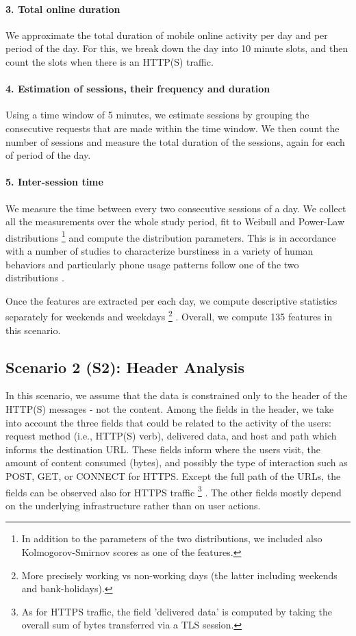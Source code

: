 \paragraph{3. Total online duration} We approximate the total duration of mobile online activity per day and per period of the day. For this, we break down the day into 10 minute slots, and then count the slots when there is an HTTP(S) traffic. 

\paragraph{4. Estimation of sessions, their frequency and duration} Using a time window of 5 minutes, we estimate sessions by grouping the consecutive requests that are made within the time window. We then count the number of sessions and measure the total duration of the sessions, again for each of period of the day. 

\paragraph{5. Inter-session time} We measure the time between every two consecutive sessions of a day. We collect all the measurements over the whole study period, fit to Weibull and Power-Law distributions
\footnote{In addition to the parameters of the two distributions, we included also Kolmogorov-Smirnov scores as one of the features.}
 and compute the distribution parameters. This is in accordance with a number of studies to characterize burstiness in a variety of human behaviors \cite{barabasi2005origin} and particularly phone usage patterns follow one of the two distributions \cite{jiang2013calling}.

Once the features are extracted per each day, we compute descriptive statistics separately for weekends and weekdays
\footnote{More precisely working vs non-working days (the latter including weekends and bank-holidays).}
. Overall, we compute 135 features in this scenario. 

\subsection{Scenario 2 (S2): Header Analysis}
In this scenario, we assume that the data is constrained only to the header of the HTTP(S) messages - not the content. Among the fields in the header, we take into account the three fields that could be related to the activity of the users: request method (i.e., HTTP(S) verb), delivered data, and host and path which informs the destination URL. These fields inform where the users visit, the amount of content consumed (bytes), and possibly the type of interaction such as POST, GET, or CONNECT for HTTPS. Except the full path of the URLs, the fields can be observed also for HTTPS traffic
\footnote{As for HTTPS traffic, the field 'delivered data' is computed by taking the overall sum of bytes transferred via a TLS session.}
. The other fields mostly depend on the underlying infrastructure rather than on user actions. 

